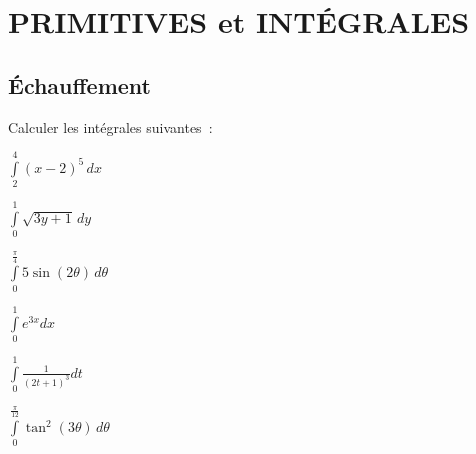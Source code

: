 
\section{PRIMITIVES et INTÉGRALES}


\subsection{Échauffement}



\begin{exo} Calculer les intégrales suivantes~:
    \begin{examplescol}{3}
        \item $\int \limits _{2} ^{4} (x-2)^{5}\,dx$
        \item $\int \limits _{0} ^{1} \sqrt{3y+1}\, dy$
        \item $\int \limits _{0} ^{\frac{\pi}{4}} 5\sin(2\theta) \,d\theta$
        \item $\int \limits _{0} ^{1} e^{3x}dx$
        \item $\int \limits _{0} ^{1} \frac{1}{(2t+1)^{3}} dt$
        \item $\int \limits _{0} ^{\frac{\pi}{12}} \tan^{2}(3\theta)\, d\theta$
    \end{examplescol}
\end{exo}

